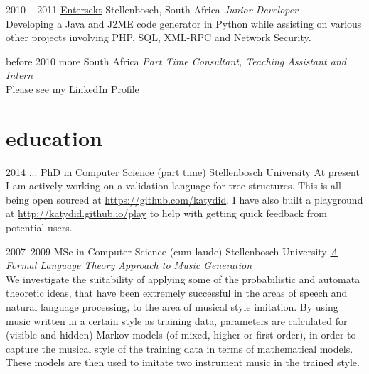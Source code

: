 \documentclass[]{friggeri-cv} %
\begin{document}
\begin{entrylist}
\entry
{2010 -- 2011}
{\href{https://www.entersekt.com/}{Entersekt}}
{Stellenbosch, South Africa}
{\emph{Junior Developer} \\
Developing a Java and J2ME code generator in Python while assisting on various other projects involving PHP, SQL, XML-RPC and Network Security.}

\entry
{before 2010}
{more}
{South Africa}
{\emph{Part Time Consultant, Teaching Assistant and Intern} \\
\href{https://za.linkedin.com/in/schulzewalter}{Please see my LinkedIn Profile}
}

\end{entrylist}

\newpage

\section{education}


\begin{entrylist}

\entry
{2014 ...}
{PhD {\normalfont in Computer Science} (part time)}
{Stellenbosch University}
{At present I am actively working on a validation language for tree structures.
This is all being open sourced at \href{https://github.com/katydid}{https://github.com/katydid}.
I have also built a playground at \href{http://katydid.github.io/play}{http://katydid.github.io/play} to help with getting quick feedback from potential users.}

\entry
{2007--2009}
{MSc {\normalfont in Computer Science} (cum laude)}
{Stellenbosch University}
{\href{http://superwillow.sourceforge.net/}{\emph{A Formal Language Theory Approach to Music Generation}} \\ We investigate the suitability of applying some of the probabilistic and automata theoretic ideas, that have been extremely successful in the areas of speech and natural language processing, to the area of musical style imitation. By using music written in a certain style as training data, parameters are calculated for (visible and hidden) Markov models (of mixed, higher or first order), in order to capture the musical style of the training data in terms of mathematical models. These models are then used to imitate two instrument music in the trained style.}

\end{entrylist}
\end{document}
